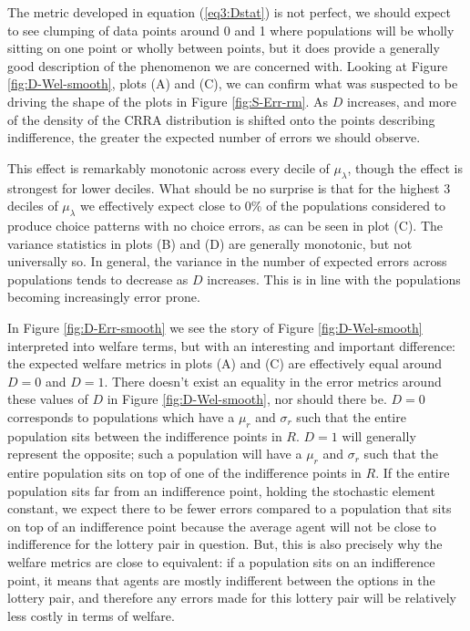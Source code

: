 \documentclass[../main.tex]{subfiles}
\begin{document}
The metric developed in equation (\ref{eq3:Dstat}) is not perfect, we should expect to see clumping of data points around 0 and 1 where populations will be wholly sitting on one point or wholly between points, but it does provide a generally good description of the phenomenon we are concerned with.
Looking at Figure \ref{fig:D-Wel-smooth}, plots (A) and (C), we can confirm what was suspected to be driving the shape of the plots in Figure \ref{fig:S-Err-rm}.
As $D$ increases, and more of the density of the CRRA distribution is shifted onto the points describing indifference, the greater the expected number of errors we should observe.

This effect is remarkably monotonic across every decile of $\mu_\lambda$, though the effect is strongest for lower deciles.
What should be no surprise is that for the highest 3 deciles of $\mu_\lambda$ we effectively expect close to $0\%$ of the populations considered to produce choice patterns with no choice errors, as can be seen in plot (C).
The variance statistics in plots (B) and (D) are generally monotonic, but not universally so.
In general, the variance in the number of expected errors across populations tends to decrease as $D$ increases.
This is in line with the populations becoming increasingly error prone.

In Figure \ref{fig:D-Err-smooth} we see the story of Figure \ref{fig:D-Wel-smooth} interpreted into welfare terms, but with an interesting and important difference: the expected welfare metrics in plots (A) and (C) are effectively equal around $D=0$ and $D=1$.
There doesn't exist an equality in the error metrics around these values of $D$ in Figure \ref{fig:D-Wel-smooth}, nor should there be.
$D=0$ corresponds to populations which have a $\mu_r$ and $\sigma_r$ such that the entire population sits between the indifference points in $R$.
$D=1$ will generally{\footnotemark} represent the opposite; such a population will have a $\mu_r$ and $\sigma_r$ such that the entire population sits on top of one of the indifference points in $R$.
If the entire population sits far from an indifference point, holding the stochastic element constant, we expect there to be fewer errors compared to a population that sits on top of an indifference point because the average agent will not be close to indifference for the lottery pair in question.
But, this is also precisely why the welfare metrics are close to equivalent: if a population sits on an indifference point, it means that agents are mostly indifferent between the options in the lottery pair, and therefore any errors made for this lottery pair will be relatively less costly in terms of welfare.
\end{document}
